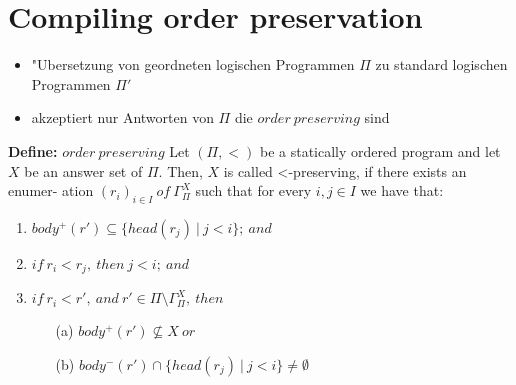 \section{Compiling order preservation}

\begin{frame}
  \begin{itemize}
    \item "Ubersetzung von geordneten logischen Programmen $\Pi$ zu standard logischen Programmen $\Pi'$
    \item akzeptiert nur Antworten von $\Pi$ die $order~preserving$ sind
  \end{itemize}
\end{frame}


\begin{frame}
  \begin{block}{\textbf{Define:} $order~preserving$}
    Let $(\Pi, <)$ be a statically ordered program and
    let $X$ be an answer set of $\Pi$.
    Then, $X$ is called <-preserving, if there exists an enumer-
    ation $(r_i)_{i \in I}~of~\Gamma^{X}_{\Pi}$  such that for every $i, j \in I$ we have that:
    \begin{enumerate}
      \item $body^+(r') \subseteq \{head(r_j)~|~j < i\};~and$
      \item $if~r_i < r_j,~then~j < i;~and$
      \item $if~r_i < r',~and~r' \in \Pi\setminus\Gamma^{X}_{\Pi},~then$
        \begin{itemize}
          \item[(a)] $body^+(r') \nsubseteq X~or$
          \item[(b)] $body^-(r') \cap \{head(r_j)~|~j < i\} \neq \emptyset$
        \end{itemize}
    \end{enumerate}
  \end{block}
\end{frame}
